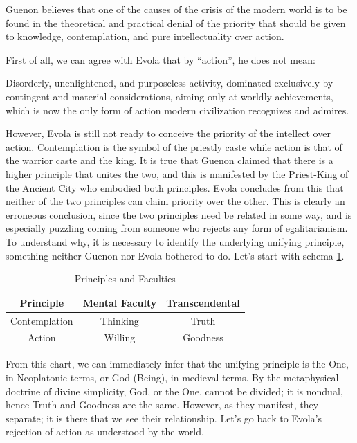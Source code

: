 \begin{quotex} 
Guenon believes that one of the causes of the crisis of the modern world is to be found in the theoretical and practical denial of the priority that should be given to knowledge, contemplation, and pure intellectuality over action.
\end{quotex}


First of all, we can agree with Evola that by ``action'', he does not mean:

\begin{quotex}
Disorderly, unenlightened, and purposeless activity, dominated exclusively by contingent and material considerations, aiming only at worldly achievements, which is now the only form of action modern civilization recognizes and admires.
\end{quotex}


However, Evola is still not ready to conceive the priority of the intellect over action. Contemplation is the symbol of the priestly caste while action is that of the warrior caste and the king. It is true that Guenon claimed that there is a higher principle that unites the two, and this is manifested by the Priest-King of the Ancient City who embodied both principles. Evola concludes from this that neither of the two principles can claim priority over the other. This is clearly an erroneous conclusion, since the two principles need be related in some way, and is especially puzzling coming from someone who rejects any form of egalitarianism. To understand why, it is necessary to identify the underlying unifying principle, something neither Guenon nor Evola bothered to do. Let's start with schema \ref{tab:PrinciplesFaculties}.

\begin{table}[h]
\begin{tabular}{ccc}\toprule
\textbf{Principle} & \textbf{Mental Faculty} & \textbf{Transcendental}\\\midrule

Contemplation & Thinking & Truth \\

Action & Willing & Goodness \\\bottomrule
\end{tabular}
\caption{Principles and Faculties}
\label{tab:PrinciplesFaculties}
\end{table}

From this chart, we can immediately infer that the unifying principle is the One, in Neoplatonic terms, or God (Being), in medieval terms. By the metaphysical doctrine of divine simplicity, God, or the One, cannot be divided; it is nondual, hence Truth and Goodness are the same. However, as they manifest, they separate; it is there that we see their relationship. Let's go back to Evola's rejection of action as understood by the world.

